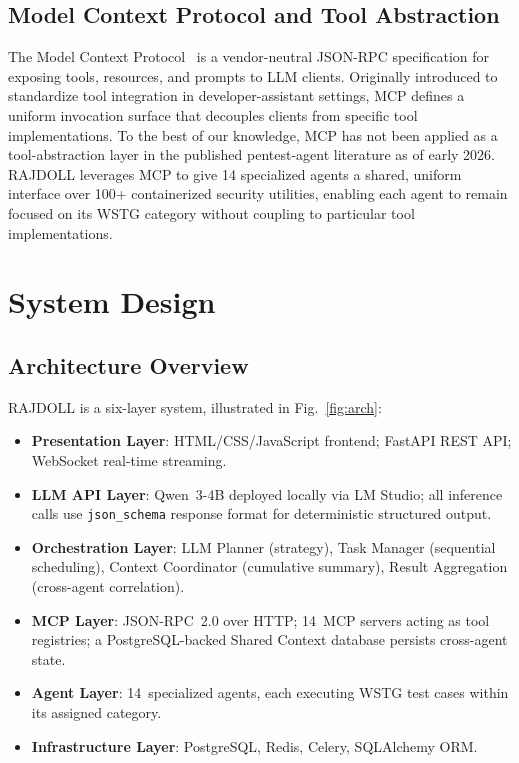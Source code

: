 \documentclass[conference]{IEEEtran}
\begin{document}
\subsection{Model Context Protocol and Tool Abstraction}

The Model Context Protocol~\cite{mcp} is a vendor-neutral JSON-RPC specification for exposing tools, resources, and prompts to LLM clients. Originally introduced to standardize tool integration in developer-assistant settings, MCP defines a uniform invocation surface that decouples clients from specific tool implementations. To the best of our knowledge, MCP has not been applied as a tool-abstraction layer in the published pentest-agent literature as of early 2026. RAJDOLL leverages MCP to give 14 specialized agents a shared, uniform interface over 100+ containerized security utilities, enabling each agent to remain focused on its WSTG category without coupling to particular tool implementations.

\section{System Design}

\subsection{Architecture Overview}

RAJDOLL is a six-layer system, illustrated in
Fig.~\ref{fig:arch}:
\begin{itemize}
  \item \textbf{Presentation Layer}: HTML/CSS/JavaScript
    frontend; FastAPI REST API; WebSocket real-time streaming.
  \item \textbf{LLM API Layer}: Qwen~3-4B deployed locally via
    LM Studio; all inference calls use \texttt{json\_schema}
    response format for deterministic structured output.
  \item \textbf{Orchestration Layer}: LLM Planner (strategy),
    Task Manager (sequential scheduling), Context Coordinator
    (cumulative summary), Result Aggregation (cross-agent
    correlation).
  \item \textbf{MCP Layer}: JSON-RPC~2.0 over HTTP; 14~MCP
    servers acting as tool registries; a PostgreSQL-backed Shared
    Context database persists cross-agent state.
  \item \textbf{Agent Layer}: 14~specialized agents, each
    executing WSTG test cases within its assigned category.
  \item \textbf{Infrastructure Layer}: PostgreSQL, Redis, Celery,
    SQLAlchemy ORM.
\end{itemize}
\end{document}
